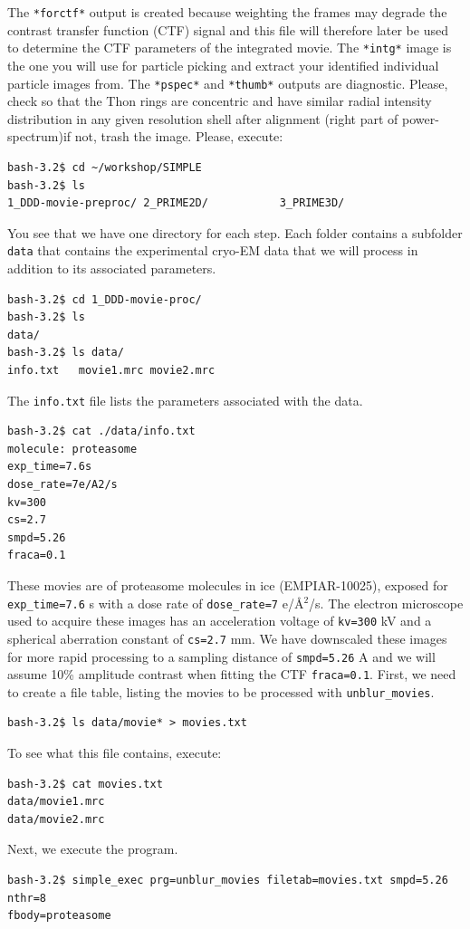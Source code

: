 \documentclass[a4paper,11pt]{article}
\newcommand{\prgname}[1]{\textcolor{NavyBlue}{\texttt{#1}}}
\begin{document}
The \texttt{*forctf*} output is created because weighting the frames may degrade the contrast transfer function (CTF) signal and this file will therefore later be used to determine the CTF parameters of the integrated movie. The \texttt{*intg*} image is the one you will use for particle picking and extract your identified individual particle images from. The \texttt{*pspec*} and \texttt{*thumb*} outputs are diagnostic. Please, check so that the Thon rings are concentric and have similar radial intensity distribution in any given resolution shell after alignment (right part of power-spectrum)\textemdash{}if not, trash the image. Please, execute:
\begin{verbatim}
bash-3.2$ cd ~/workshop/SIMPLE
bash-3.2$ ls
1_DDD-movie-preproc/ 2_PRIME2D/           3_PRIME3D/
\end{verbatim}
You see that we have one directory for each step. Each folder contains a subfolder \texttt{data} that contains the experimental cryo-EM data that we will process in addition to its associated parameters.
\begin{verbatim}
bash-3.2$ cd 1_DDD-movie-proc/
bash-3.2$ ls
data/
bash-3.2$ ls data/
info.txt   movie1.mrc movie2.mrc
\end{verbatim}
The \texttt{info.txt} file lists the parameters associated with the data.
\begin{verbatim}
bash-3.2$ cat ./data/info.txt 
molecule: proteasome
exp_time=7.6s
dose_rate=7e/A2/s
kv=300
cs=2.7
smpd=5.26
fraca=0.1
\end{verbatim}
These movies are of proteasome molecules in ice (EMPIAR-10025), exposed for \texttt{exp\_time=7.6} s with a dose rate of \texttt{dose\_rate=7} e/\AA{}$^2$/s. The  electron microscope used to acquire these images has an acceleration voltage of \texttt{kv=300} kV and a spherical aberration constant of \texttt{cs=2.7} mm. We have downscaled these images for more rapid processing to a sampling distance of \texttt{smpd=5.26} A and we will assume 10\% amplitude contrast when fitting the CTF \texttt{fraca=0.1}. First, we need to create a file table, listing the movies to be processed with  \prgname{unblur\_movies}.
\begin{verbatim}
bash-3.2$ ls data/movie* > movies.txt
\end{verbatim}
To see what this file contains, execute:
\begin{verbatim}
bash-3.2$ cat movies.txt 
data/movie1.mrc
data/movie2.mrc
\end{verbatim}
Next, we execute the program.
\begin{verbatim}
bash-3.2$ simple_exec prg=unblur_movies filetab=movies.txt smpd=5.26 nthr=8
fbody=proteasome
\end{verbatim}
\end{document}
